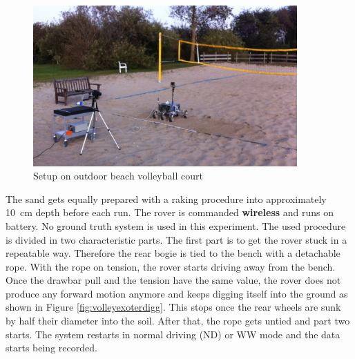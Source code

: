 \documentclass[a4paper,twocolumn]{esapub2005} %
\begin{document}
\begin{figure}[h!]
    \centering
    \includegraphics[width=0.9\textwidth]{volley.jpg}
    \caption{Setup on outdoor beach volleyball court}
    \label{fig:volley}
\end{figure}



The sand gets equally prepared with a raking procedure into approximately
10~\unit{cm} depth before each run.  The rover is commanded \textbf{wireless}
and runs on battery. No ground truth system is used in this experiment. The
used procedure is divided in two characteristic parts. The first part is to get
the rover stuck in a repeatable way. Therefore the rear bogie is tied to the
bench with a detachable rope. With the rope on tension, the rover starts
driving away from the bench. Once the drawbar pull and the tension have the
same value, the rover does not produce any forward motion anymore and keeps
digging itself into the ground as shown in Figure \ref{fig:volleyexoterdigg}.
This stops once the rear wheels are sunk by half their diameter into the soil.
After that, the rope gets untied and part two starts. The system restarts in
normal driving (ND) or WW mode and the data starts being recorded. 
\end{document}
